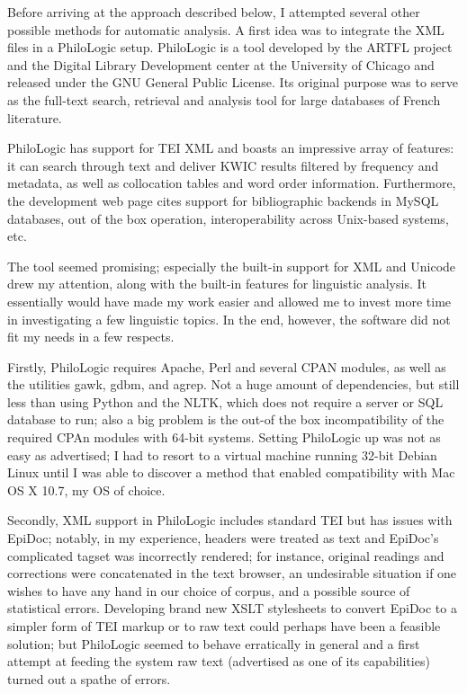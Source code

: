 Before arriving at the approach described below, I attempted several other
possible methods for automatic analysis. A first idea was to integrate the XML
files in a PhiloLogic setup.  PhiloLogic is a tool developed by the ARTFL
project and the Digital Library Development center at the University of Chicago
and released under the GNU General Public License. Its original purpose was to
serve as the full-text search, retrieval and analysis tool for large databases
of French literature.

PhiloLogic has support for TEI XML and boasts an impressive
array of features: it can search through text and deliver KWIC results
filtered by frequency and metadata, as well as collocation tables and word
order information.  Furthermore, the development web page cites support for
bibliographic backends in MySQL databases, out of the box operation,
interoperability across Unix-based systems, etc.

The tool seemed promising; especially the built-in support for XML and
Unicode drew my attention, along with the built-in features for linguistic
analysis. It essentially would have made my work easier and allowed me to
invest more time in investigating a few linguistic topics. In the end, however,
the software did not fit my needs in a few respects.

Firstly, PhiloLogic requires Apache, Perl and several CPAN modules, as well as
the utilities gawk, gdbm, and agrep.  Not a huge amount of dependencies, but
still less than using Python and the NLTK, which does not require a server or
SQL database to run; also a big problem is the out-of the box incompatibility
of the required CPAn  modules with 64-bit systems. Setting PhiloLogic up was
not as easy as advertised; I had to resort to a virtual machine running 32-bit
Debian Linux until I was able to discover a method that enabled compatibility
with Mac OS X 10.7, my OS of choice.

Secondly, XML support in PhiloLogic includes standard TEI  but has issues with
EpiDoc; notably, in my experience, headers were treated as text and EpiDoc's
complicated tagset was incorrectly rendered; for instance, original readings
and corrections were concatenated in the text browser, an undesirable situation
if one wishes to have any hand in our choice of corpus, and a possible source of
statistical errors.  Developing brand new XSLT stylesheets to convert EpiDoc to
a simpler form of TEI markup or to raw text could perhaps have been a feasible
solution; but PhiloLogic seemed to behave erratically in general and a first
attempt at feeding the system raw text (advertised as one of its capabilities)
turned out a spathe of errors.

